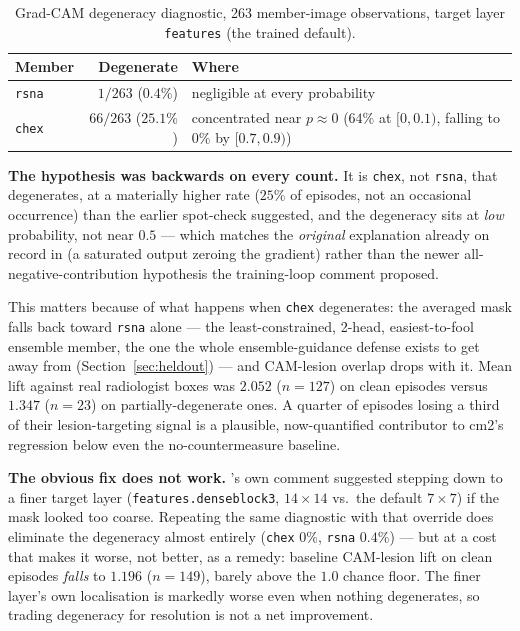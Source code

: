 \begin{table}[h]
\centering
\caption{Grad-CAM degeneracy diagnostic, 263 member-image observations,
target layer \texttt{features} (the trained default).}
\label{tab:gradcam_diag}
\begin{tabular}{@{}lrl@{}}
\toprule
\textbf{Member} & \textbf{Degenerate} & \textbf{Where} \\
\midrule
\texttt{rsna} & $1/263$ ($0.4\%$) & negligible at every probability \\
\texttt{chex} & $66/263$ ($25.1\%$) & concentrated near $p \approx 0$
($64\%$ at $[0,0.1)$, falling to $0\%$ by $[0.7,0.9)$) \\
\bottomrule
\end{tabular}
\end{table}

\textbf{The hypothesis was backwards on every count.} It is \texttt{chex},
not \texttt{rsna}, that degenerates, at a materially higher rate ($25\%$
of episodes, not an occasional occurrence) than the earlier spot-check
suggested, and the degeneracy sits at \emph{low} probability, not near
$0.5$ --- which matches the \emph{original} explanation already on record
in  (a saturated output zeroing the gradient) rather
than the newer all-negative-contribution hypothesis the training-loop
comment proposed.

This matters because of what happens when \texttt{chex} degenerates: the
averaged mask falls back toward \texttt{rsna} alone --- the
least-constrained, 2-head, easiest-to-fool ensemble member, the one the
whole ensemble-guidance defense exists to get away from
(Section~\ref{sec:heldout}) --- and CAM-lesion overlap drops with it. Mean
lift against real radiologist boxes was $2.052$ ($n=127$) on clean
episodes versus $1.347$ ($n=23$) on partially-degenerate ones. A quarter
of episodes losing a third of their lesion-targeting signal is a
plausible, now-quantified contributor to cm2's regression below even the
no-countermeasure baseline.

\textbf{The obvious fix does not work.} 's own comment
suggested stepping down to a finer target layer
(\texttt{features.denseblock3}, $14\times14$ vs.\ the default $7\times7$)
if the mask looked too coarse. Repeating the same diagnostic with that
override does eliminate the degeneracy almost entirely (\texttt{chex}
$0\%$, \texttt{rsna} $0.4\%$) --- but at a cost that makes it worse, not
better, as a remedy: baseline CAM-lesion lift on clean episodes \emph{falls}
to $1.196$ ($n=149$), barely above the $1.0$ chance floor. The finer
layer's own localisation is markedly worse even when nothing degenerates,
so trading degeneracy for resolution is not a net improvement.

